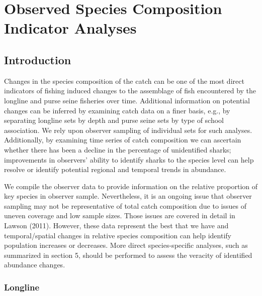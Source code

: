 \documentclass[12pt]{SCreport}
\begin{document}
      
\section{Observed Species Composition Indicator Analyses}

 \subsection{Introduction}
Changes in the species composition of the catch can be one of the most direct indicators of fishing induced changes to the assemblage of fish encountered by the longline and purse seine fisheries over time.  Additional information on potential changes can be inferred by examining catch data on a finer basis, e.g., by separating longline sets by depth and purse seine sets by type of school association.  We rely upon observer sampling of individual sets for such analyses.  Additionally, by examining time series of catch composition we can ascertain whether there has been a decline in the percentage of unidentified sharks; improvements in observers' ability to identify sharks to the species level can help resolve or identify potential regional and temporal trends in abundance.

We compile the observer data to provide information on the relative proportion of key species in observer sample.  Nevertheless, it is an ongoing issue that observer sampling may not be representative of total catch composition due to issues of uneven coverage and low sample sizes.  Those issues are covered in detail in Lawson (2011). However, these data represent the best that we have and temporal/spatial changes in relative species composition can help identify population increases or decreases.  More direct species-specific analyses, such as summarized in section 5, should be performed to assess the veracity of identified abundance changes.

      
  \subsubsection{Longline}  
  
\end{document}

